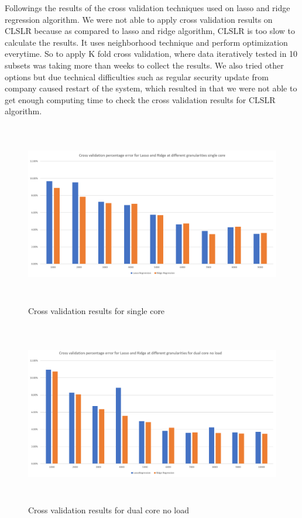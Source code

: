 \par Followings the results of the cross validation techniques used on lasso and ridge regression algorithm.  We were not able to apply cross validation results on CLSLR because as compared to lasso and ridge algorithm, CLSLR is too slow to calculate the results.  It uses neighborhood technique and perform optimization everytime.  So to apply K fold cross validation, where data iteratively tested in 10 subsets was taking more than weeks to collect the results.  We also tried other options but due technical difficulties such as regular security update from company caused restart of the system, which resulted in that we were not able to get enough computing time to check the cross validation results for CLSLR algorithm. 

\begin{figure}[h!]
\includegraphics[width=12cm, height=8cm]{./images/CV_single_core}
\centering
\caption{Cross validation results for single core}
\label{fig:training}
\end{figure}

\begin{figure}[h!]
\includegraphics[width=12cm, height=8cm]{./images/cv_no_load}
\centering
\caption{Cross validation results for dual core no load}
\label{fig:training}
\end{figure}

